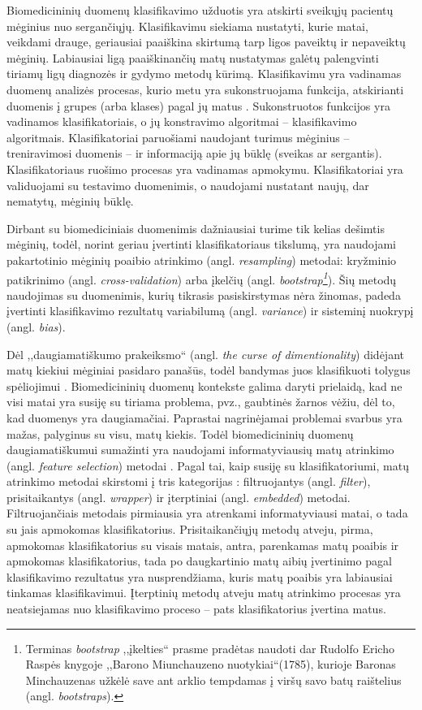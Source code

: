 Biomedicininių duomenų klasifikavimo užduotis yra atskirti sveikųjų pacientų mėginius nuo sergančiųjų. Klasifikavimu siekiama nustatyti, kurie matai, veikdami drauge, geriausiai paaiškina skirtumą tarp ligos paveiktų ir nepaveiktų mėginių. Labiausiai ligą paaiškinančių matų nustatymas galėtų palengvinti tiriamų ligų diagnozės ir gydymo metodų kūrimą. Klasifikavimu yra vadinamas duomenų analizės procesas, kurio metu yra sukonstruojama funkcija, atskirianti duomenis į grupes (arba klases) pagal jų matus \cite{fisher1936use}. Sukonstruotos funkcijos yra vadinamos klasifikatoriais, o jų konstravimo algoritmai -- klasifikavimo algoritmais. Klasifikatoriai paruošiami naudojant turimus mėginius -- treniravimosi duomenis -- ir informaciją apie jų būklę (sveikas ar sergantis). Klasifikatoriaus ruošimo procesas yra vadinamas apmokymu. Klasifikatoriai yra validuojami su testavimo duomenimis, o naudojami nustatant naujų, dar nematytų, mėginių būklę.

Dirbant su biomediciniais duomenimis dažniausiai turime tik kelias dešimtis mėginių, todėl, norint geriau įvertinti klasifikatoriaus tikslumą, yra naudojami pakartotinio mėginių poaibio atrinkimo (angl. \textit{resampling}) metodai: kryžminio patikrinimo (angl. \textit{cross-validation}) arba įkelčių (angl. \textit{bootstrap\footnote{Terminas \textit{bootstrap} ,,įkelties`` prasme pradėtas naudoti dar Rudolfo Ericho Raspės knygoje ,,Barono Miunchauzeno nuotykiai``(1785), kurioje Baronas Minchauzenas užkėlė save ant arklio tempdamas į viršų savo batų raištelius (angl. \textit{bootstraps}).}}). Šių metodų naudojimas su duomenimis, kurių tikrasis pasiskirstymas nėra žinomas, padeda įvertinti klasifikavimo rezultatų variabilumą (angl. \textit{variance}) ir sisteminį nuokrypį (angl. \textit{bias}).

Dėl ,,daugiamatiškumo prakeiksmo`` (angl. \textit{the curse of dimentionality}) didėjant matų kiekiui mėginiai pasidaro panašūs, todėl bandymas juos klasifikuoti tolygus spėliojimui \cite{bellman1966adaptive}. Biomedicininių duomenų kontekste galima daryti prielaidą, kad ne visi matai yra susiję su tiriama problema, pvz., gaubtinės žarnos vėžiu, dėl to, kad duomenys yra daugiamačiai. Paprastai nagrinėjamai problemai svarbus yra mažas, palyginus su visu, matų kiekis.  Todėl biomedicininių duomenų daugiamatiškumui sumažinti yra naudojami informatyviausių matų atrinkimo (angl. \textit{feature selection}) metodai \cite{guyon2003introduction}. Pagal tai, kaip susiję su klasifikatoriumi, matų atrinkimo metodai skirstomi į tris kategorijas \cite{saeys2008robust}: filtruojantys (angl. \textit{filter}), prisitaikantys (angl. \textit{wrapper}) ir įterptiniai (angl. \textit{embedded}) metodai. Filtruojančiais metodais pirmiausia yra atrenkami informatyviausi matai, o tada su jais apmokomas klasifikatorius. 
Prisitaikančiųjų metodų atveju, pirma, apmokomas klasifikatorius su visais matais, antra, parenkamas matų poaibis ir apmokomas klasifikatorius, tada po daugkartinio matų aibių įvertinimo pagal klasifikavimo rezultatus yra nusprendžiama, kuris matų poaibis yra labiausiai tinkamas klasifikavimui. Įterptinių metodų atveju matų atrinkimo procesas yra neatsiejamas nuo klasifikavimo proceso -- pats klasifikatorius įvertina matus.

